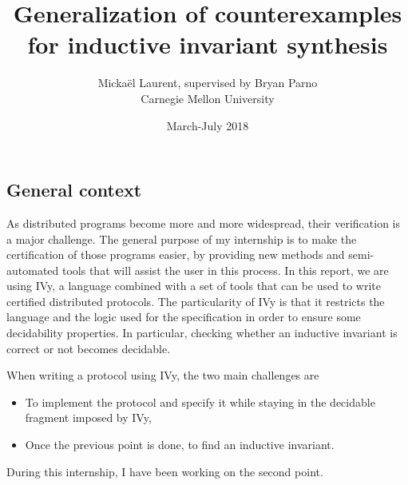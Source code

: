 \documentclass{article}
\newenvironment{point}[1]%
{\subsection*{#1}}%
{}
\begin{document}

\title{Generalization of counterexamples for inductive invariant synthesis}

\author{Mickaël Laurent, supervised by Bryan Parno\\Carnegie Mellon University}

\date{March-July 2018}

\maketitle

\pagestyle{empty} %
\thispagestyle{empty}


\begin{point}{General context}
  
  As distributed programs become more and more widespread, their verification is a major challenge.
  The general purpose of my internship is to make the certification of those programs easier, by providing new methods and semi-automated tools that will assist the user in this process.
  In this report, we are using IVy, a language combined with a set of tools that can be used to write certified distributed protocols.
  The particularity of IVy is that it restricts the language and the logic used for the specification in order to ensure some decidability properties.
  In particular, checking whether an inductive invariant is correct or not becomes decidable.

  When writing a protocol using IVy, the two main challenges are
  \begin{itemize}
    \item To implement the protocol and specify it while staying in the decidable fragment imposed by IVy,
    \item Once the previous point is done, to find an inductive invariant.
  \end{itemize}

  During this internship, I have been working on the second point.

\end{point}
\end{document}

